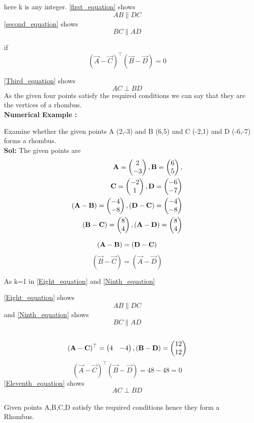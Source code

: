 \documentclass{article}
\begin{document}
{here k is any integer.}
\eqref{first_equation} shows 
$$AB \parallel DC $$
\eqref{second_equation} shows 
$$BC \parallel AD$$

if 
\begin{equation}\label{Third_equation}
(\vec{A}-\vec{C} )^ \top ( \vec{B}-\vec{D} ) = 0 
\end{equation}

\eqref{Third_equation} shows
$$AC \perp BD $$
{As the given four points satisfy the required conditions we can say that they are the vertices of a rhombus.}\\
\textbf{Numerical Example :}
 
{Examine whether the given points A (2,-3) and B (6,5) and C (-2,1) and D (-6,-7) forms a rhombus.}\\

 \textbf{Sol:}
 The given points are
\begin{align} 
\vec{A} = \myvec{2\\-3},\vec{B} =\myvec{6\\5},\\
\vec{C} =\myvec{-2\\1}, \vec{D} =\myvec{-6\\-7}\\
(\vec{A}-\vec{B} ) = \myvec{-4\\-8}, (\vec{D}-\vec{C} ) = \myvec{-4\\-8}\\
(\vec{B}-\vec{C} ) = \myvec{8\\4}, (\vec{A}-\vec{D} ) = \myvec{8\\4}
\end{align} 

\begin{equation}\label{Eight_equation}
(\vec{A}-\vec{B} ) = (\vec{D}-\vec{C} )  \\
\end{equation}
\begin{equation}\label{Ninth_equation}
(\vec{B}-\vec{C} )  = (\vec{A}-\vec{D} ) 
\end{equation}

{As k=1 in \eqref{Eight_equation} and \eqref{Ninth_equation}}

\eqref{Eight_equation} shows $$ AB  {\parallel} DC $$ and \eqref{Ninth_equation} shows $$BC \parallel AD $$\\
    
\begin{align}
(\vec{A}-\vec{C} )^\top = \myvec{4&-4 }
,(\vec{B}-\vec{D} ) = \myvec{12\\12}
\end{align}
\begin{equation}\label{Eleventh_equation}
(\vec{A}-\vec{C} )^ \top ( \vec{B}-\vec{D} ) = 48-48 = 0
\end{equation}
 \eqref{Eleventh_equation} shows
$$AC \perp BD $$\\ 
{Given points A,B,C,D satisfy the required 
conditions hence they form a Rhombus.}
\end{document}
